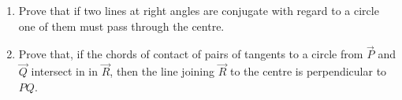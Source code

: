 \begin{enumerate}[label=\arabic*.,ref=\thesubsection.\theenumi]
\begin{enumerate}
\end{enumerate}
\item Prove that if two lines at right angles are conjugate with regard to a circle one of them must pass through the centre.
\item Prove that, if the chords of contact of pairs of tangents to a circle from $\vec{P}$ and $\vec{Q}$ intersect in in $\vec{R}$, then the line joining $\vec{R}$ to
the centre is perpendicular to $PQ$.
\end{enumerate}
